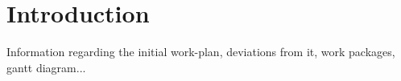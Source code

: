 \chapter{Introduction}

Information regarding the initial work-plan, deviations from it, work packages, gantt diagram...
